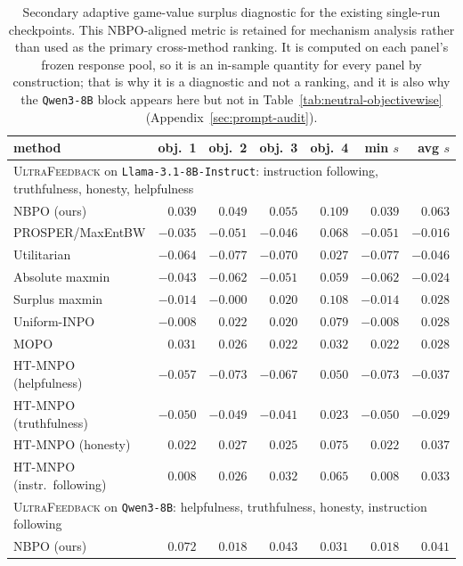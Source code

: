 \documentclass{article}
\theoremstyle{remark}
\theoremstyle{plain}
\newcommand{\NBPO}{\textsc{NBPO}}
\begin{document}
\begin{table}[t]
\centering\scriptsize
\setlength{\tabcolsep}{3.2pt}
\caption{Secondary adaptive game-value surplus diagnostic for the existing single-run checkpoints. This NBPO-aligned metric is retained for mechanism analysis rather than used as the primary cross-method ranking. It is computed on each panel's frozen response pool, so it is an in-sample quantity for every panel by construction; that is why it is a diagnostic and not a ranking, and it is also why the \texttt{Qwen3-8B} block appears here but not in Table~\ref{tab:neutral-objectivewise} (Appendix~\ref{sec:prompt-audit}).}
\label{tab:objectivewise-appendix}
\begin{tabular}{lrrrrrr}
\toprule
method & obj.\ 1 & obj.\ 2 & obj.\ 3 & obj.\ 4 & min $s$ & avg $s$\\
\midrule
\multicolumn{7}{l}{\textsc{UltraFeedback} on \texttt{Llama-3.1-8B-Instruct}: instruction following, truthfulness, honesty, helpfulness}\\
\NBPO{} (ours) & $0.039$ & $0.049$ & $0.055$ & $0.109$ & $0.039$ & $0.063$\\
PROSPER/MaxEntBW & $-0.035$ & $-0.051$ & $-0.046$ & $0.068$ & $-0.051$ & $-0.016$\\
Utilitarian & $-0.064$ & $-0.077$ & $-0.070$ & $0.027$ & $-0.077$ & $-0.046$\\
Absolute maxmin & $-0.043$ & $-0.062$ & $-0.051$ & $0.059$ & $-0.062$ & $-0.024$\\
Surplus maxmin & $-0.014$ & $-0.000$ & $0.020$ & $0.108$ & $-0.014$ & $0.028$\\
Uniform-INPO & $-0.008$ & $0.022$ & $0.020$ & $0.079$ & $-0.008$ & $0.028$\\
MOPO & $0.031$ & $0.026$ & $0.022$ & $0.032$ & $0.022$ & $0.028$\\
HT-MNPO (helpfulness) & $-0.057$ & $-0.073$ & $-0.067$ & $0.050$ & $-0.073$ & $-0.037$\\
HT-MNPO (truthfulness) & $-0.050$ & $-0.049$ & $-0.041$ & $0.023$ & $-0.050$ & $-0.029$\\
HT-MNPO (honesty) & $0.022$ & $0.027$ & $0.025$ & $0.075$ & $0.022$ & $0.037$\\
HT-MNPO (instr.\ following) & $0.008$ & $0.026$ & $0.032$ & $0.065$ & $0.008$ & $0.033$\\
\midrule
\multicolumn{7}{l}{\textsc{UltraFeedback} on \texttt{Qwen3-8B}: helpfulness, truthfulness, honesty, instruction following}\\
\NBPO{} (ours) & $0.072$ & $0.018$ & $0.043$ & $0.031$ & $0.018$ & $0.041$\\

\end{tabular}
\end{table}
\end{document}
